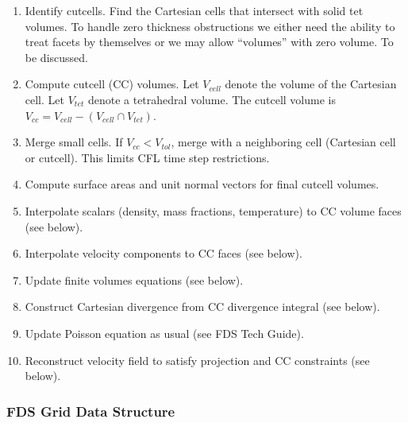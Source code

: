 \documentclass[12pt]{article}
\begin{document}
\begin{enumerate}
\item Identify cutcells.  Find the Cartesian cells that intersect with solid tet volumes.  To handle zero thickness obstructions we either need the ability to treat facets by themselves or we may allow ``volumes'' with zero volume.  To be discussed.
\item Compute cutcell (CC) volumes.  Let $V_{cell}$ denote the volume of the Cartesian cell.  Let $V_{tet}$ denote a tetrahedral volume.  The cutcell volume is $V_{cc} = V_{cell} - ( V_{cell} \cap V_{tet} )$.
\item Merge small cells.  If $V_{cc} < V_{tol}$, merge with a neighboring cell (Cartesian cell or cutcell).  This limits CFL time step restrictions.
\item Compute surface areas and unit normal vectors for final cutcell volumes.
\item Interpolate scalars (density, mass fractions, temperature) to CC volume faces (see below).
\item Interpolate velocity components to CC faces (see below).
\item Update finite volumes equations (see below).
\item Construct Cartesian divergence from CC divergence integral (see below).
\item Update Poisson equation as usual (see FDS Tech Guide).
\item Reconstruct velocity field to satisfy projection and CC constraints (see below).
\end{enumerate}

\subsubsection{FDS Grid Data Structure}
\end{document}
